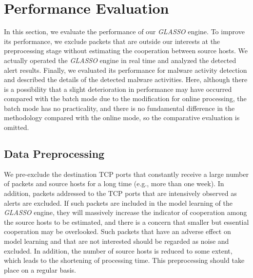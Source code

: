 \documentclass[conference]{IEEEtran}
\begin{document}
\section{Performance Evaluation}
In this section, we evaluate the performance of our \textit{GLASSO} engine.
To improve its performance, we exclude packets that are outside our interests at the preprocessing stage without estimating the cooperation between source hosts.
We actually operated the \textit{GLASSO} engine in real time and analyzed the detected alert results.
Finally, we evaluated its performance for malware activity detection and described the details of the detected malware activities.
Here, although there is a possibility that a slight deterioration in performance may have occurred compared with the batch mode due to the modification for online processing, the batch mode has no practicality, and there is no fundamental difference in the methodology compared with the online mode, so the comparative evaluation is omitted.


\subsection{Data Preprocessing}
We pre-exclude the destination TCP ports that constantly receive a large number of packets and source hosts for a long time (e.g., more than one week).
In addition, packets addressed to the TCP ports that are intensively observed as alerts are excluded.
If such packets are included in the model learning of the \textit{GLASSO} engine, they will massively increase the indicator of cooperation among the source hosts to be estimated, and there is a concern that smaller but essential cooperation may be overlooked.
Such packets that have an adverse effect on model learning and that are not interested should be regarded as noise and excluded.
In addition, the number of source hosts is reduced to some extent, which leads to the shortening of processing time.
This preprocessing should take place on a regular basis.
\end{document}
